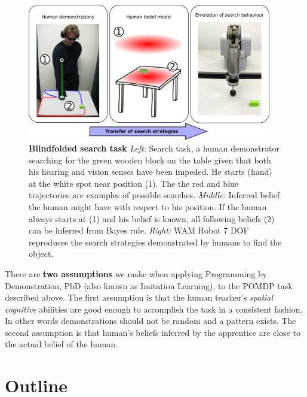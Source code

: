 \begin{figure}[h]
  \centering
  \includegraphics[width=0.95\textwidth]{./ch3-Search/Figures/Figure1.pdf}
  \caption{\textbf{Blindfolded search task} \textit{Left:}  Search task, a human demonstrator searching for the green wooden block on the table given
  that both his hearing and vision senses have been impeded. He starts (hand) at the white spot near position (1). The the red and blue trajectories 
  are examples of possible searches.
  \textit{Middle:} Inferred belief the human might have with respect to his position. If the human always starts at (1) and his belief is known, all 
  following beliefs (2) can be inferred from Bayes rule. \textit{Right:} WAM Robot 7 DOF
  reproduces the search strategies demonstrated by humans to find the object.}
 \label{fig:searching}
\end{figure} 

There are \textbf{two assumptions} we make when applying Programming by Demonstration, PbD (also known as Imitation Learning), to the POMDP task described above. 
The first assumption is that the human teacher's \textit{spatial cognitive} abilities are good enough to accomplish 
the task in a consistent fashion. In other words demonstrations should not be random and a pattern exists. The second assumption is that human's beliefs inferred  
by the apprentice are close to the actual belief of the human. 

\section{Outline}

